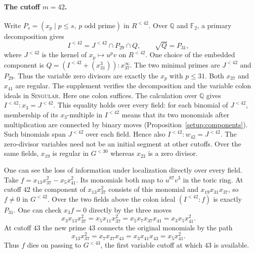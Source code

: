 \paragraph{The cutoff $m=42$.}
Write $P_s=(x_p\mid p\le s,\ p\text{ odd prime})$ in $R^{<42}$.
Over $\mathbb Q$ and $\mathbb F_2$, a primary decomposition gives
\[
 I^{<42}=J^{<42}\cap P_{29}\cap Q,\qquad \sqrt Q=P_{31},
\]
where $J^{<42}$ is the kernel of $x_p\mapsto u^pv$ on $R^{<42}$.
One choice of the embedded component is
$Q=(I^{<42}+(x_{31}^3)):x_{37}^\infty$.
The two minimal primes are $J^{<42}$ and $P_{29}$.
Thus the variable zero divisors are exactly the $x_p$ with $p\le31$.
Both $x_{37}$ and $x_{41}$ are regular. The supplement verifies the
decomposition and the variable colon ideals in \textsc{Singular}.
Here one colon suffices. The calculation over $\mathbb Q$ gives
$I^{<42}:x_3=J^{<42}$. This equality holds over every field: for each
binomial of $J^{<42}$, membership of its $x_3$-multiple in $I^{<42}$
means that its two monomials after multiplication are connected by
binary moves (Proposition~\ref{setup:components}). Such binomials
span $J^{<42}$ over each field. Hence also $I^{<42}:w_{42}=J^{<42}$.
The zero-divisor variables need not be an initial segment at other
cutoffs. Over the same fields, $x_{19}$ is regular in $G^{<30}$
whereas $x_{23}$ is a zero divisor.

One can see the loss of information under localization directly over
every field. Take $f=x_{13}x_{37}^2-x_5x_{41}^2$. Its monomials both
map to $u^{87}v^3$ in the toric ring. At cutoff $42$ the component of
$x_{13}x_{37}^2$ consists of this monomial and $x_{19}x_{31}x_{37}$,
so $f\ne0$ in $G^{<42}$. Over the two fields above the colon ideal
$(I^{<42}:f)$ is exactly $P_{31}$. One can check $x_3 f=0$ directly
by the three moves
\[
 x_3x_{13}x_{37}^2=x_5x_{11}x_{37}^2
 =x_5x_7x_{37}x_{41}=x_3x_5x_{41}^2 .
\]
At cutoff $43$ the new prime $43$ connects the original monomials by the path
\[
 x_{13}x_{37}^2=x_7x_{37}x_{43}=x_3x_{41}x_{43}=x_5x_{41}^2 .
\]
Thus $f$ dies on passing to $G^{<43}$, the first variable cutoff
at which $43$ is available.

